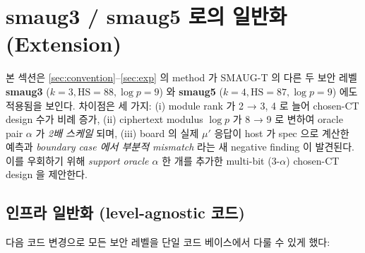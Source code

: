 \documentclass[11pt]{article}
\theoremstyle{plain}
\theoremstyle{definition}
\theoremstyle{remark}
\newcommand{\HS}{\mathrm{HS}}
\begin{document}
\section{smaug3 / smaug5 로의 일반화 (Extension)}
\label{sec:extension}

본 섹션은 \cref{sec:convention}--\cref{sec:exp} 의 method 가
SMAUG-T 의 다른 두 보안 레벨 \textbf{smaug3} ($k=3, \HS=88, \log p=9$) 와
\textbf{smaug5} ($k=4, \HS=87, \log p=9$) 에도 적용됨을 보인다. 차이점은
세 가지: (i) module rank 가 2 → 3, 4 로 늘어 chosen-CT design 수가 비례
증가, (ii) ciphertext modulus $\log p$ 가 8 → 9 로 변하여 oracle pair $\alpha$
가 \emph{2배 스케일} 되며, (iii) board 의 실제 $\mu'$ 응답이 host 가 spec 으로
계산한 예측과 \emph{boundary case 에서 부분적 mismatch} 라는 새 negative
finding 이 발견된다. 이를 우회하기 위해 \emph{support oracle $\alpha$} 한 개를
추가한 multi-bit (3-$\alpha$) chosen-CT design 을 제안한다.

\subsection{인프라 일반화 (level-agnostic 코드)}
\label{sec:ext-infra}

다음 코드 변경으로 모든 보안 레벨을 단일 코드 베이스에서 다룰 수 있게 했다:
\end{document}
